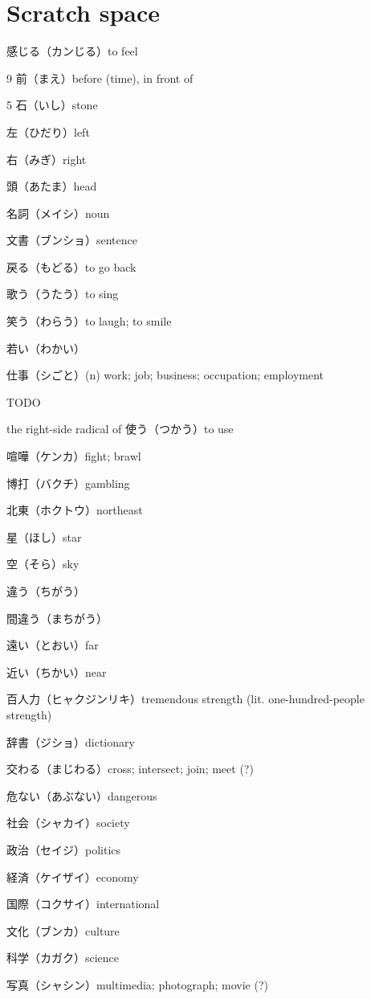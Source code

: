\chapter{Scratch space}

感じる（カンじる）to feel

9 前（まえ）before (time), in front of

5 石（いし）stone

左（ひだり）left

右（みぎ）right

頭（あたま）head

名詞（メイシ）noun

文書（ブンショ）sentence

戻る（もどる）to go back

歌う（うたう）to sing

笑う（わらう）to laugh; to smile

若い（わかい）

仕事（シごと）(n) work; job; business; occupation; employment

TODO

the right-side radical of 使う（つかう）to use

喧嘩（ケンカ）fight; brawl

博打（バクチ）gambling

北東（ホクトウ）northeast

星（ほし）star

空（そら）sky

違う（ちがう）

間違う（まちがう）

遠い（とおい）far

近い（ちかい）near

百人力（ヒャクジンリキ）tremendous strength (lit. one-hundred-people strength)

辞書（ジショ）dictionary

交わる（まじわる）cross; intersect; join; meet (?)

危ない（あぶない）dangerous

社会（シャカイ）society

政治（セイジ）politics

経済（ケイザイ）economy

国際（コクサイ）international

文化（ブンカ）culture

科学（カガク）science

写真（シャシン）multimedia; photograph; movie (?)


